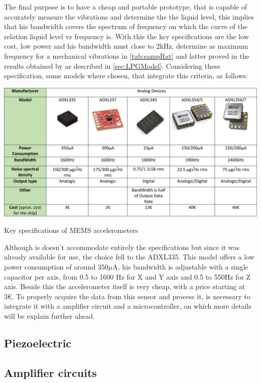 The final purpose is to have a cheap and portable prototype, that is capable of accurately measure the vibrations and determine the the liquid level, this implies that his bandwidth covers the spectrum of frequency on which the curve of the relation liquid level vs frequency is. With this the key specifications are the low cost, low power and his bandwidth must close to 2kHz, determine as maximum frequency for a mechanical vibrations in \ref{tab:sampRat} and latter proved in the results obtained by \citeauthor{wuLiquidLevelDetector2014b} as described in \ref{sec:LPGModel}. Considering these specification, some models where chosen, that integrate this criteria, as follows:
\begin{table}
    \centering
    \includegraphics[width=1\textwidth]{Chapters/3CHP/Images/accTable.pdf}
    \caption{Key specifications of MEMS accelerometers}
    \label{fig:acctable}
\end{table}
Although is doesn't accommodate entirely the specifications but since it was already available for use, the choice fell to the ADXL335. This model offers a low power consumption of around 350$\mu$A, his bandwidth is adjustable with a single capacitor per axis, from 0.5 to 1600 Hz for X and Y axis and 0.5 to 550Hz for Z axis. Beside this the accelerometer itself is very cheap, with a price starting at 3€. To properly acquire the data from this sensor and process it, is necessary to integrate it with a amplifier circuit and a microcontroller, on which more details will be explain further ahead.
\subsection{Piezoelectric}

\subsection{Amplifier circuits}
